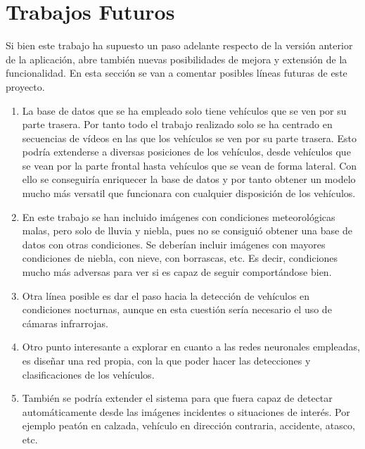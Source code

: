 \section{Trabajos Futuros}

Si bien este trabajo ha supuesto un paso adelante respecto de la versión anterior de la aplicación, abre también nuevas posibilidades de mejora y extensión de la funcionalidad. En esta sección se van a comentar posibles líneas futuras de este proyecto.

\begin{enumerate}
    \item La base de datos que se ha empleado solo tiene vehículos que se ven por su parte trasera. Por tanto todo el trabajo realizado solo se ha centrado en secuencias de vídeos en las que los vehículos se ven por su parte trasera. Esto podría extenderse a diversas posiciones de los vehículos, desde vehículos que se vean por la parte frontal hasta vehículos que se vean de forma lateral. Con ello se conseguiría enriquecer la base de  datos y por tanto obtener un modelo mucho más versatil que funcionara con cualquier disposición de los vehículos.
    \item En este trabajo se han incluido imágenes con condiciones meteorológicas malas, pero solo de lluvia y niebla, pues no se consiguió obtener una base de datos con otras condiciones. Se deberían incluir imágenes con mayores condiciones de niebla, con nieve, con borrascas, etc. Es decir, condiciones mucho más adversas para ver si es capaz de seguir comportándose bien.
    \item Otra línea posible es dar el paso hacia la detección de vehículos en condiciones nocturnas, aunque en esta cuestión sería necesario el uso de cámaras infrarrojas.
    \item Otro punto interesante a explorar en cuanto a las redes neuronales empleadas, es diseñar una red propia, con la que poder hacer las detecciones y clasificaciones de los vehículos.
    \item También se podría extender el sistema para que fuera capaz de detectar automáticamente desde las imágenes incidentes o situaciones de interés. Por ejemplo peatón en calzada, vehículo en dirección contraria, accidente, atasco, etc.
\end{enumerate}{}
